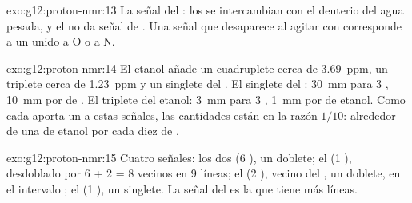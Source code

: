 \begin{solution}{exo:g12:proton-nmr:13}
La señal del : los   se intercambian con el
deuterio del agua pesada, y el  no da señal de . Una señal
que desaparece al agitar con  corresponde a un  unido a O
o a N.
\end{solution}

\begin{solution}{exo:g12:proton-nmr:14}
El etanol añade un cuadruplete cerca de \qty{3.69}{ppm}, un triplete
cerca de \qty{1.23}{ppm} y un singlete del . El singlete del
: \qty{30}{mm} para 3 , \qty{10}{mm} por  de .
El triplete del etanol: \qty{3}{mm} para 3 , \qty{1}{mm} por
 de etanol. Como cada  aporta un  a estas señales,
las cantidades están en la razón $1/10$: alrededor de una  de
etanol por cada diez de .
\end{solution}

\begin{solution}{exo:g12:proton-nmr:15}
Cuatro señales: los dos  (6 ), un doblete; el  (1
), desdoblado por 6 + 2 = 8 vecinos en 9 líneas; el  (2
), vecino del , un doblete, en el intervalo ; el
 (1 ), un singlete. La señal del  es la que tiene más
líneas.
\end{solution}


